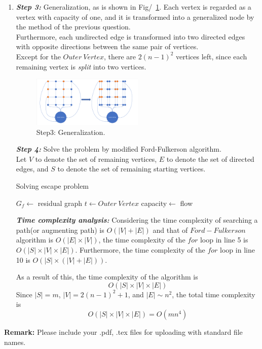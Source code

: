 \documentclass[12pt,a4paper]{article}
\makeatletter
\newtheorem*{solution}{Solution}
\theoremstyle{definition}
\renewenvironment{solution}[1][Solution] {\par\pushQED{\qed}\normalfont\topsep6\p@\@plus6\p@\relax\trivlist\item[\hskip\labelsep\bfseries#1\@addpunct{.}]\ignorespaces}{\popQED\endtrivlist\@endpefalse} \makeatother
\makeatother
\begin{document}
\begin{enumerate}
\begin{solution}
\begin{enumerate}
	\textbf{\textit{Step 3:}} Generalization, as is shown in Fig/~\ref{Fig-STEP3}.
	Each vertex is regarded as a vertex with capacity of one, and it is transformed into a generalized node by the method of the previous question.
	\\
	Furthermore, each undirected edge is transformed into two directed edges with opposite directions between the same pair of vertices. 
	\\
	Except for the $Outer\ Vertex$, there are $2(n-1)^2$ vertices left, since each remaining vertex is \emph{split} into two vertices. 
	\begin{figure}[!htbp]
	\centering
	\includegraphics[width=0.5\textwidth]{Fig-P3T1STEP3.pdf}
	\caption{Step3: Generalization.}
	\label{Fig-STEP3}
	\end{figure}
	
	\textbf{\textit{Step 4:}} Solve the problem by modified Ford-Fulkerson algorithm.
	\\
	Let $V$ to denote the set of remaining vertices, $E$ to denote the set of directed edges, and $S$ to denote the set of remaining starting vertices.
	\\
	\begin{algorithm}[H]
	\caption{Solving escape problem}\label{Alg-SEP}
	\BlankLine
	
	$G_f\leftarrow$ residual graph\;
	$t\leftarrow Outer\ Vertex$\;
    capacity$\leftarrow$ flow\;
	\end{algorithm}
	\textbf{\textit{Time complexity analysis:}}
	Considering the time complexity of searching a path(or augmenting path) is $O(|V|+|E|)$ and that of $Ford-Fulkerson$ algorithm is $O(|E|\times|V|)$, the time complexity of the $for$ loop in line 5 is $O(|S|\times|V|\times|E|)$. Furthermore, the time complexity of the $for$ loop in line 10 is $O(|S|\times (|V|+|E|))$. 
	
	As a result of this, the time complexity of the algorithm is $$O(|S|\times|V|\times|E|)$$
	Since $|S|=m$, $|V|=2(n-1)^2+1$, and $|E|\sim n^2$, the total time complexity is $$O(|S|\times|V|\times|E|)=O(mn^4)$$
    \end{enumerate}
    \end{solution}
    
    
    
\end{enumerate}

\textbf{Remark:} Please include your .pdf, .tex files for uploading with standard file names.
\newpage


\end{document}
